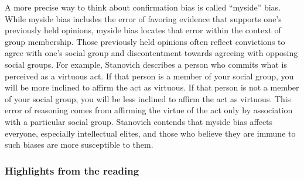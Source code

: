 \documentclass[
]{book}
\begin{document}
A more precise way to think about confirmation bias is called ``myside'' bias. While myside bias includes the error of favoring evidence that supports one's previously held opinions, myside bias locates that error within the context of group membership. Those previously held opinions often reflect convictions to agree with one's social group and discontentment towards agreeing with opposing social groups. For example, Stanovich describes a person who commits what is perceived as a virtuous act. If that person is a member of your social group, you will be more inclined to affirm the act as virtuous. If that person is not a member of your social group, you will be less inclined to affirm the act as virtuous. This error of reasoning comes from affirming the virtue of the act only by association with a particular social group. Stanovich contends that myside bias affects everyone, especially intellectual elites, and those who believe they are immune to such biases are more susceptible to them.

\hypertarget{highlights-from-the-reading-3}{%
\subsubsection*{Highlights from the reading}\label{highlights-from-the-reading-3}}
\end{document}
